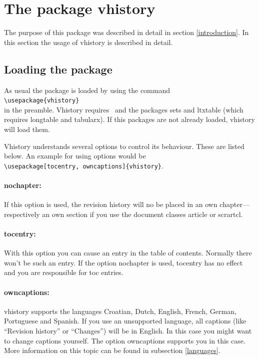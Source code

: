\section{The package vhistory}

The purpose of this package was described in detail in section \ref{introduction}.
In this section the usage of vhistory is described in detail.

\subsection{Loading the package}\label{load}
As usual the package is loaded by using the command\\
\mbox{}\hspace{2em}\verb|\usepackage{vhistory}|\\
in the preamble. Vhistory requires \LaTeXe\ and the packages sets and ltxtable (which requires longtable and tabularx). If this packages are not already loaded, vhistory will load them.

Vhistory understands several options to control its behaviour. These are listed below. An example for using options would be\\
\mbox{}\hspace{2em}\verb|\usepackage[tocentry, owncaptions]{vhistory}|.

\paragraph{nochapter:} If this option is used, the revision history will no be placed in an own chapter---respectively an own section if you use the document classes article or scrartcl.

\paragraph{tocentry:} With this option you can cause an entry in the table of contents. Normally there won't be such an entry. If the option nochapter is used, tocentry has no effect and you are responsible for toc entries.

\paragraph{owncaptions:} vhistory supports the languages Croatian, Dutch, English, French, German, Portuguese and Spanish. If you use an unsupported language, all captions (like ``Revision history'' or ``Chan\-ges'') will be in English. In this case you might want to change captions yourself. The option own\-capt\-ions supports you in this case. More information on this topic can be found in subsection \ref{languages}.

